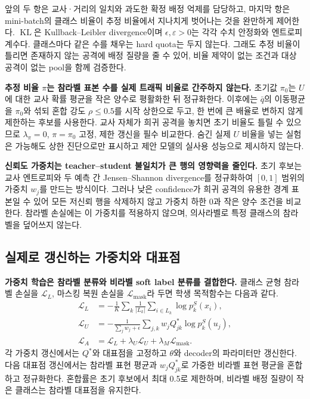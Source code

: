 앞의 두 항은 교사·거리의 일치와 과도한 확정 배정 억제를 담당하고, 마지막 항은 mini-batch의 클래스 비율이 추정 비율에서 지나치게 벗어나는 것을 완만하게 제어한다. $\operatorname{KL}$은 Kullback--Leibler divergence이며 $\epsilon,\varepsilon>0$는 각각 수치 안정화와 엔트로피 계수다. 클래스마다 같은 수를 채우는 hard quota는 두지 않는다. 그래도 추정 비율이 틀리면 존재하지 않는 공격에 배정 질량을 줄 수 있어, 비율 제약이 없는 조건과 대상 공격이 없는 pool을 함께 검증한다.

\textbf{추정 비율 $\pi$는 참라벨 표본 수를 실제 트래픽 비율로 간주하지 않는다.} 초기값 $\pi_0$는 $U$에 대한 교사 확률 평균을 작은 양수로 평활화한 뒤 정규화한다. 이후에는 $\bar q$의 이동평균을 $\pi_0$와 섞되 혼합 강도 $\rho\leq0.5$를 시작 상한으로 두고, 한 번에 큰 배율로 변하지 않게 제한하는 후보를 사용한다. 교사 자체가 희귀 공격을 놓치면 초기 비율도 틀릴 수 있으므로 $\lambda_\pi=0$, $\pi=\pi_0$ 고정, 제한 갱신을 필수 비교한다. 숨긴 실제 $U$ 비율을 넣는 실험은 가능해도 상한 진단으로만 표시하고 제안 모델의 실사용 성능으로 제시하지 않는다.

\textbf{신뢰도 가중치는 teacher--student 불일치가 큰 행의 영향력을 줄인다.} 초기 후보는 교사 엔트로피와 두 예측 간 Jensen--Shannon divergence를 정규화하여 $[0,1]$ 범위의 가중치 $w_j$를 만드는 방식이다. 그러나 낮은 confidence가 희귀 공격의 유용한 경계 표본일 수 있어 모든 저신뢰 행을 삭제하지 않고 가중치 하한 0과 작은 양수 조건을 비교한다. 참라벨 손실에는 이 가중치를 적용하지 않으며, 의사라벨로 특정 클래스의 참라벨을 덮어쓰지 않는다.

\subsection{실제로 갱신하는 가중치와 대표점}
\textbf{가중치 학습은 참라벨 분류와 비라벨 soft label 분류를 결합한다.} 클래스 균형 참라벨 손실을 $\mathcal L_L$, 마스킹 복원 손실을 $\mathcal L_{\mathrm{mask}}$라 두면 학생 목적함수는 다음과 같다.
\begin{align}
 \mathcal L_L&=-\frac1K\sum_k\frac1{|L_k|}\sum_{i\in L_k}\log p^S_k(x_i),\\
 \mathcal L_U&=-\frac1{\sum_jw_j+\epsilon}\sum_{j,k}w_jQ^*_{jk}\log p^S_k(u_j),\\
 \mathcal L_A&=\mathcal L_L+\lambda_U\mathcal L_U+\lambda_M\mathcal L_{\mathrm{mask}}.
\end{align}
각 가중치 갱신에서는 $Q^*$와 대표점을 고정하고 $\theta$와 decoder의 파라미터만 갱신한다. 다음 대표점 갱신에서는 참라벨 표현 평균과 $w_jQ^*_{jk}$로 가중한 비라벨 표현 평균을 혼합하고 정규화한다. 혼합률은 초기 후보에서 최대 0.5로 제한하며, 비라벨 배정 질량이 작은 클래스는 참라벨 대표점을 유지한다.

